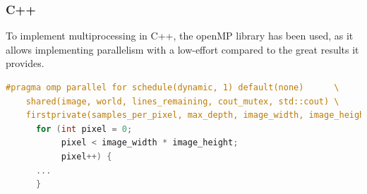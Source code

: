\subsubsection{C++}
To implement multiprocessing in C++, the \gls{openMP} library has been used, as it allows implementing parallelism with a low-effort compared to the great results it provides. 

\begin{lstlisting}[language=C++, caption={OpenMP Pragma instruction.}, label={lst:openmp_pragma}]
#pragma omp parallel for schedule(dynamic, 1) default(none)      \
    shared(image, world, lines_remaining, cout_mutex, std::cout) \
    firstprivate(samples_per_pixel, max_depth, image_width, image_height)
      for (int pixel = 0;
           pixel < image_width * image_height;
           pixel++) {
      ...
      }    
\end{lstlisting}

